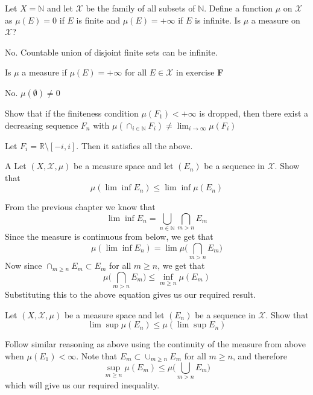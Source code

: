 \begin{exercise}[F]
	Let $X=\mathbb{N}$ and let $\mathcal{X}$ be the family of all subsets of $\mathbb{N}$. Define a function $\mu$ on $ \mathcal{X}$ as $\mu(E) = 0$ if $E$ is finite and $\mu(E) = +\infty$ if $ E$ is infinite. Is $\mu$ a measure on $\mathcal{X}$?
\end{exercise}
\begin{solution}
	No. Countable union of disjoint finite sets can be infinite.
\end{solution}


\begin{exercise}[G]
	Is $\mu$ a measure if $\mu(E) = +\infty$ for all $E \in \mathcal{X}$ in exercise \textbf{F}
\end{exercise}
\begin{solution}
	No. $\mu(\emptyset) \neq 0$
\end{solution}

\begin{exercise}[H]
	Show that if the finiteness condition $\mu(F_1) < +\infty$ is dropped, then there exist a decreasing sequence $F_n$ with $\mu(\cap_{i \in \mathbb{N} } F_i) \neq \lim_{i \to \infty} \mu(F_i)$
\end{exercise}
\begin{solution}
	Let $F_i = \mathbb{R} \setminus [-i, i]$. Then it satisfies all the above.
\end{solution}

\begin{exercise}[I] A
	Let $(X, \mathcal{X}, \mu)$ be a measure space and let $(E_n)$ be a sequence in $ \mathcal{X}$. Show that $$\mu(\lim \inf E_n) \le \lim \inf \mu(E_n)$$
\end{exercise}
\begin{solution}
	From the previous chapter we know that $$\lim \inf E_n = \bigcup_{n \in \mathbb{N}} \bigcap_{m > n} E_m$$
	Since the measure is continuous from below, we get that $$\mu(\lim \inf E_n) = \lim \mu \Big( \bigcap_{m>n} E_m\Big)$$
	Now since $\cap_{m \ge n} E_m \subset E_m$ for all $m \ge n$, we get that $$\mu\Big(\bigcap_{m > n} E_m\Big) \le \inf_{m \ge n} \mu(E_m)$$
	Substituting this to the above equation gives us our required result.
\end{solution}

\begin{exercise}[J]
	Let $(X, \mathcal{X}, \mu)$ be a measure space and let $(E_n)$ be a sequence in $ \mathcal{X}$. Show that $$\lim \sup \mu(E_n) \le \mu(\lim \sup E_n)$$
\end{exercise}
\begin{solution}
	Follow similar reasoning as above using the continuity of the measure from above when $\mu(E_1) < \infty$. Note that $E_m \subset \cup_{m \ge n}E_m$ for all $  m \ge n$, and therefore $$\sup_{m \ge n}\mu(E_m) \le \mu\Big( \bigcup_{m > n} E_m\Big)$$
	which will give us our required inequality.
\end{solution}

